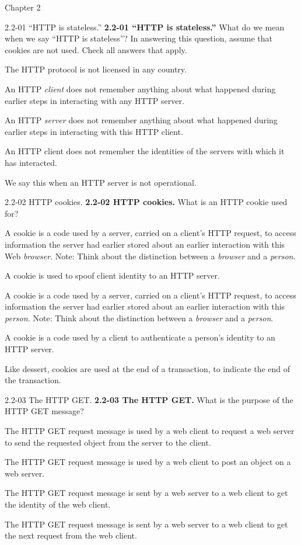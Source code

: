 \documentclass[a4paper]{article}
\begin{document}
\begin{quiz}{Chapter 2}
\begin{multi}[points=1,shuffle,multiple]{2.2-01 ``HTTP is stateless.''}
\textbf{2.2-01 “HTTP is stateless.” } What do we mean when we say ``HTTP is stateless''? In answering this question, assume that cookies are not used. Check all answers that apply.
\item The HTTP protocol is not licensed in any country.
\item An HTTP \emph{client} does not remember anything about what happened during earlier steps in interacting with any HTTP server.
\item* An HTTP \emph{server} does not remember anything about what happened during earlier steps in interacting with this HTTP client.
\item An HTTP client does not remember the identities of the servers with which it has interacted.
\item We say this when an HTTP server is not operational.
\end{multi}

\begin{multi}[points=1,shuffle]{2.2-02 HTTP cookies.}
\textbf{2.2-02 HTTP cookies. } What is an HTTP cookie used for?
\item* A cookie is a code used by a server, carried on a client's HTTP request, to access information the server had earlier stored about an earlier interaction with this Web \emph{browser}. Note: Think about the distinction between a \emph{browser} and a \emph{person}.
\item A cookie is used to spoof client identity to an HTTP server.
\item A cookie is a code used by a server, carried on a client's HTTP request, to access information the server had earlier stored about an earlier interaction with this \emph{person.} Note: Think about the distinction between a \emph{browser} and a \emph{person}.
\item A cookie is a code used by a client to authenticate a person's identity to an HTTP server.
\item Like dessert, cookies are used at the end of a transaction, to indicate the end of the transaction.
\end{multi}

\begin{multi}[points=1,shuffle]{2.2-03 The HTTP GET.}
\textbf{2.2-03 The HTTP GET.}  What is the purpose of the HTTP GET message?
\item* The HTTP GET request message is used by a web client to request a web server to send the requested object from the server to the client.
\item The HTTP GET request message is used by a web client to post an object on a web server.
\item The HTTP GET request message is sent by a web server to a web client to get the identity of the web client.
\item The HTTP GET request message is sent by a web server to a web client to get the next request from the web client.
\end{multi}


\end{quiz}
\end{document}
